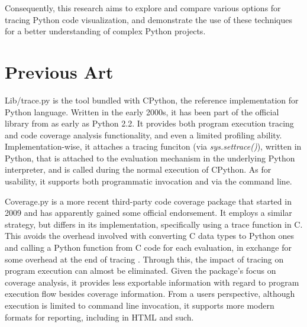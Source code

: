 \documentclass[conference]{IEEEtran}
\begin{document}
Consequently, this research aims to explore and compare various options for tracing Python code visualization, and demonstrate the use of these techniques for a better understanding of complex Python projects.\par

\section{Previous Art} %
Lib/trace.py is the tool bundled with CPython, the reference implementation for Python language\cite{cpythonlibtracepy}. Written in the early 2000s, it has been part of the official library from as early as Python 2.2. It provides both program execution tracing and code coverage analysis functionality, and even a limited profiling ability. Implementation-wise, it attaches a tracing funciton (via \textit{sys.settrace()}), written in Python, that is attached to the evaluation mechanism in the underlying Python interpreter, and is called during the normal execution of CPython\cite{trace}. As for usability, it supports both programmatic invocation and via the command line.\par

Coverage.py is a more recent third-party code coverage package that started in 2009 and has apparently gained some official endorsement\cite{batchelder_2023_coveragepy}. It employs a similar strategy, but differs in its implementation, specifically using a trace function in C. This avoids the overhead involved with converting C data types to Python ones and calling a Python function from C code for each evaluation, in exchange for some overhead at the end of tracing \cite{a2011_how}. Through this, the impact of tracing on program execution can almost be eliminated. Given the package's focus on coverage analysis, it provides less exportable information with regard to program execution flow besides coverage information. From a users perspective, although execution is limited to command line invocation, it supports more modern formats for reporting, including in HTML and such. \par
\end{document}
